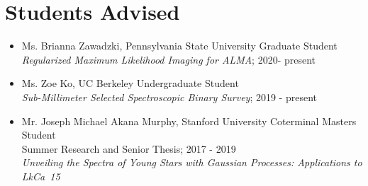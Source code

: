 \section*{Students Advised}
\begin{itemize}
  \item Ms. Brianna Zawadzki, Pennsylvania State University Graduate Student \\
  \emph{Regularized Maximum Likelihood Imaging for ALMA}; 2020- present\\
  \item Ms. Zoe Ko, UC Berkeley Undergraduate Student \\ 
  \emph{Sub-Millimeter Selected Spectroscopic Binary Survey}; 2019 - present \\
  \item Mr. Joseph Michael Akana Murphy, Stanford University Coterminal Masters Student \\
  Summer Research and Senior Thesis; 2017 - 2019\\
  \emph{Unveiling the Spectra of Young Stars with Gaussian Processes: Applications to LkCa~15}
\end{itemize}
